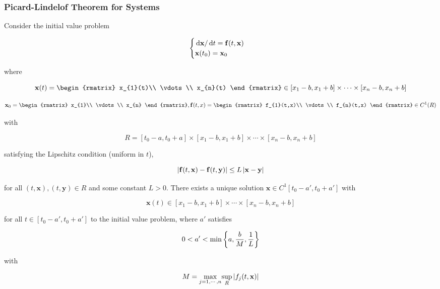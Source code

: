 \documentclass[a4paper,12pt]{article}
\begin{document}
\subsubsection{Picard-Lindelof Theorem for Systems}
\begin{thm}
  Consider the initial value problem

  $$\begin{cases}
    \,\mathrm{d}\mathbf{x}/\,\mathrm{d} t=\mathbf{f}(t,\mathbf{x})\\
    \mathbf{x}(t_{0})=\mathbf{x}_{0}
  \end{cases}$$\s

  where

  $$\mathbf{x}(t)=\begin{rmatrix}
    x_{1}(t)\\
    \vdots\\
    x_{n}(t)
  \end{rmatrix}\in[x_{1}-b,x_{1}+b]\times\cdots\times[x_{n}-b,x_{n}+b]$$\s

  $$\mathbf{x}_{0}=\begin{rmatrix}
    x_{1}\\
    \vdots\\
    x_{n}
  \end{rmatrix},\mathbf{f}(t,x)=\begin{rmatrix}
    f_{1}(t,x)\\
    \vdots\\
    f_{n}(t,x)
  \end{rmatrix}\in C^{1}(R)$$\s

  with

  $$R=[t_{0}-a,t_{0}+a]\times[x_{1}-b,x_{1}+b]\times\cdots\times[x_{n}-b,x_{n}+b]$$\s

  satisfying the Lipschitz condition (uniform in $t$),

  $$\left| \mathbf{f}(t,\mathbf{x})-\mathbf{f}(t,\mathbf{y})\right|\leq L\left| \mathbf{x}-\mathbf{y}\right|$$\s

  for all $(t,\mathbf{x}),(t,\mathbf{y})\in R$ and some constant $L>0$. There exists a unique solution $\mathbf{x}\in C^{1}[t_{0}-a',t_{0}+a']$ with

  $$\mathbf{x}(t)\in[x_{1}-b,x_{1}+b]\times\cdots\times[x_{n}-b,x_{n}+b]$$\s

  for all $t\in[t_{0}-a',t_{0}+a']$ to the initial value problem, where $a'$ satisfies

  $$0<a'<\min\left\{ a,\frac{b}{M},\frac{1}{L}\right\}$$\s

  with

  $$M=\underset{j=1,\cdots,n}{\max}\underset{R}{\sup}\left| f_{j}(t,\mathbf{x})\right|$$
\end{thm}\n
\end{document}
